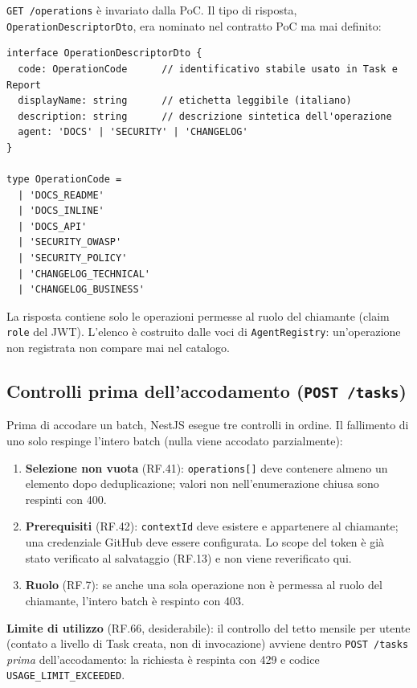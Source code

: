 \documentclass[11pt,a4paper]{article}
\begin{document}
\texttt{GET /operations} è invariato dalla PoC. Il tipo di risposta, \texttt{OperationDescriptorDto}, era nominato nel contratto PoC ma mai definito:

\begin{lstlisting}[caption={\texttt{OperationDescriptorDto}: schema restituito da \texttt{GET /operations}.}]
interface OperationDescriptorDto {
  code: OperationCode      // identificativo stabile usato in Task e Report
  displayName: string      // etichetta leggibile (italiano)
  description: string      // descrizione sintetica dell'operazione
  agent: 'DOCS' | 'SECURITY' | 'CHANGELOG'
}

type OperationCode =
  | 'DOCS_README'
  | 'DOCS_INLINE'
  | 'DOCS_API'
  | 'SECURITY_OWASP'
  | 'SECURITY_POLICY'
  | 'CHANGELOG_TECHNICAL'
  | 'CHANGELOG_BUSINESS'
\end{lstlisting}

La risposta contiene solo le operazioni permesse al ruolo del chiamante (claim \texttt{role} del JWT). L'elenco è costruito dalle voci di \texttt{AgentRegistry}: un'operazione non registrata non compare mai nel catalogo.

\subsection{Controlli prima dell'accodamento (\texttt{POST /tasks})}

Prima di accodare un batch, NestJS esegue tre controlli in ordine. Il fallimento di uno solo respinge l'intero batch (nulla viene accodato parzialmente):

\begin{enumerate}
    \item \textbf{Selezione non vuota} (RF.41): \texttt{operations[]} deve contenere almeno un elemento dopo deduplicazione; valori non nell'enumerazione chiusa sono respinti con 400.
    \item \textbf{Prerequisiti} (RF.42): \texttt{contextId} deve esistere e appartenere al chiamante; una credenziale GitHub deve essere configurata. Lo scope del token è già stato verificato al salvataggio (RF.13) e non viene reverificato qui.
    \item \textbf{Ruolo} (RF.7): se anche una sola operazione non è permessa al ruolo del chiamante, l'intero batch è respinto con 403.
\end{enumerate}

\textbf{Limite di utilizzo} (RF.66, desiderabile): il controllo del tetto mensile per utente (contato a livello di Task creata, non di invocazione) avviene dentro \texttt{POST /tasks} \emph{prima} dell'accodamento: la richiesta è respinta con 429 e codice \texttt{USAGE\_LIMIT\_EXCEEDED}.
\end{document}
